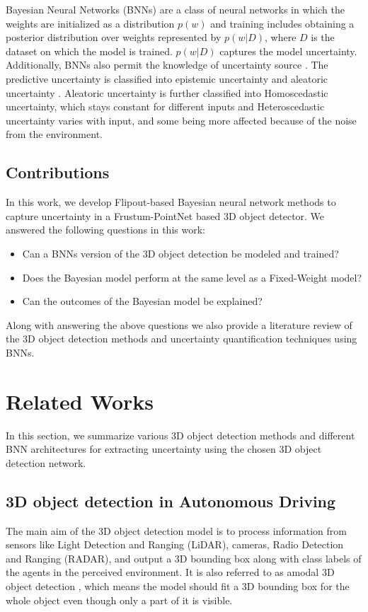 \documentclass[10pt,twocolumn,letterpaper]{article}
\begin{document}
Bayesian Neural Networks (BNNs) \cite{tran2016edward, Shridhar2018, Tran2019} are a class of neural networks in which the weights are initialized as a distribution $p(w)$ and training includes obtaining a posterior distribution over weights represented by $p (w|D)$, where $D$ is the dataset on which the model is trained. $p (w|D)$ captures the model uncertainty. Additionally, BNNs also permit the knowledge of uncertainty source \cite{Henne2020}. The predictive uncertainty is classified into epistemic uncertainty and aleatoric uncertainty \cite{Kendall2017}. Aleatoric uncertainty is further classified into Homoscedastic uncertainty, which stays constant for different inputs and Heteroscedastic uncertainty varies with input, and some being more affected because of the noise from the environment.


\subsection{Contributions}
In this work, we develop Flipout-based Bayesian neural network \cite{Wen2018} methods to capture uncertainty in a Frustum-PointNet based 3D object detector. We answered the following questions in this work:
\begin{itemize}
    \item Can a BNNs version of the 3D object detection be modeled and trained?
    \item Does the Bayesian model perform at the same level as a Fixed-Weight model?
    \item Can the outcomes of the Bayesian model be explained?
\end{itemize}
    
    Along with answering the above questions we also provide a literature review of the 3D object detection methods and uncertainty quantification techniques using BNNs.
\section{Related Works}
In this section, we summarize various 3D object detection methods and different BNN architectures for extracting uncertainty using the chosen 3D object detection network.

\subsection{3D object detection in Autonomous Driving}
The main aim of the 3D object detection model is to process information from sensors like Light Detection and Ranging (LiDAR), cameras, Radio Detection and Ranging (RADAR), and output a 3D bounding box along with class labels of the agents in the perceived environment. It is also referred to as amodal 3D object detection \cite{Arnold2019}, which means the model should fit a 3D bounding box for the whole object even though only a part of it is visible.
\end{document}
